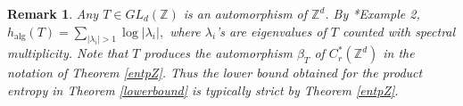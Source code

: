 \documentclass[a4paper,11pt,reqno]{amsart}
\theoremstyle{plain}
\newtheorem{rem}[thm]{Remark}
\theoremstyle{mainthmstyle}
\theoremstyle{named}
\numberwithin{equation}{section}
\newcommand{\Bea}{\begin{eqnarray*}}
\newcommand{\Eea}{\end{eqnarray*}}
\begin{document}
\begin{rem}
Any $T\in GL_{d}(\mathbb{Z})$ is an automorphism of $\mathbb{Z}^d$. By \cite{MR540634}*{Example 2}, $h_{\mathrm{alg}}(T)=\sum\limits_{\left \lvert \lambda_i \right \rvert > 1} \log \left \lvert \lambda_i \right \rvert,$ where $\lambda_i$'s are eigenvalues of $T$ counted with spectral multiplicity. Note that $T$ produces the automorphism $\beta_{T}$ of $C^{\ast}_{r}(\mathbb{Z}^d)$ in the notation of Theorem \ref{entpZ}. Thus the lower bound obtained for the product entropy in Theorem \ref{lowerbound} is typically strict by Theorem \ref{entpZ}.
\end{rem}
\end{document}
